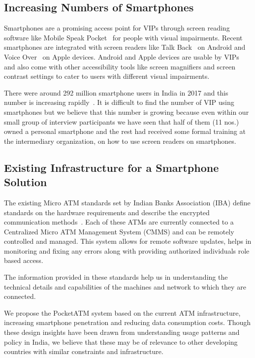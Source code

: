 \subsection{Increasing Numbers of Smartphones}
\label{ssec:smartphonenumbers}

Smartphones are a promising access point for VIPs through screen reading software like Mobile Speak Pocket~\cite{CodeFactory, bigham2010vizwiz} for people with visual impairments. Recent smartphones are integrated with screen readers like Talk Back~\cite{GoogleTalkBack} on Android and Voice Over~\cite{AppleVoiceover} on Apple devices. Android and Apple devices are usable by VIPs and also come with other accessibility tools like screen magnifiers and screen contrast settings to cater to users with different visual impairments.  

There were around 292 million smartphone users in India in 2017 and this number is increasing rapidly~\cite{IESmartPhoneUsers, SamsungJio}. It is difficult to find the number of VIP using smartphones but we believe that this number is growing because even within our small group of interview participants we have seen that half of them (11 nos.) owned a personal smartphone and the rest had received some formal training at the intermediary organization, on how to use screen readers on smartphones.

\subsection{Existing Infrastructure for a Smartphone Solution}
\label{ssec:existinginfrastructure}

The existing Micro ATM standards set by Indian Banks Association (IBA) define standards on the hardware requirements and describe the encrypted communication methods~\cite{IBA2013a}. Each of these ATMs are currently connected to a Centralized Micro ATM Management System (CMMS) and can be remotely controlled and managed. This system allows for remote software updates, helps in monitoring and fixing any errors along with providing authorized individuals role based access.  

The information provided in these standards help us in understanding the technical details and capabilities of the machines and network to which they are connected. 

We propose the PocketATM system based on the current ATM infrastructure, increasing smartphone penetration and reducing data consumption costs. Though these design insights have been drawn from understanding usage patterns and policy in India, we believe that these may be of relevance to other developing countries with similar constraints and infrastructure.


